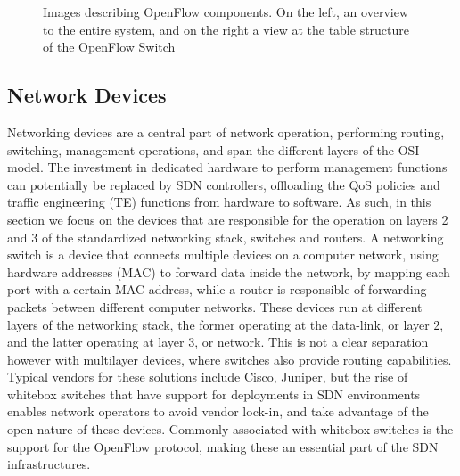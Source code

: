 \begin {enumerate}
\begin{figure} [h]
    \centering
    \begin{subfigure}
    \texttt{[image: sdn/open\_flow\_switch\_pipeline]}
    \end{subfigure}
    \begin{subfigure}
    \texttt{[image: sdn/open\_flow\_tables]}
    \end{subfigure}
    \caption{Images describing OpenFlow components. On the left, an overview to the entire system, and on the right a view at the table structure of the OpenFlow Switch}
\end{figure}

\subsection {Network Devices}

Networking devices are a central part of network operation, performing routing, switching, management operations, and span the different layers of the OSI model. The investment in dedicated hardware to perform management functions can
potentially be replaced by SDN controllers, offloading the QoS policies and traffic engineering (TE) functions from hardware to software. As such, in this section we focus on the devices that are responsible for the operation on 
layers 2 and 3 of the standardized networking stack, switches and routers. A networking switch is a device that connects multiple devices on a computer network, using hardware addresses (MAC) to forward data inside the network, 
by mapping each port with a certain MAC address, while a router is responsible of forwarding packets between different computer networks. These devices run at different layers of the networking stack, the former operating at the 
data-link, or layer 2, and the latter operating at layer 3, or network. This is not a clear separation however with multilayer devices, where switches also provide routing capabilities. Typical vendors for these solutions include
Cisco, Juniper, but the rise of whitebox switches that have support for deployments in SDN environments enables network operators to avoid vendor lock-in, and take advantage of the open nature of these devices. Commonly associated 
with whitebox switches is the support for the OpenFlow protocol, making these an essential part of the SDN infrastructures.


\end{enumerate}
